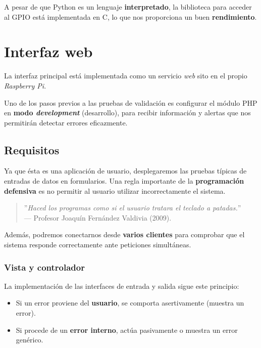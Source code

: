 A pesar de que Python es un lenguaje \textbf{interpretado}, la biblioteca para acceder al \acrshort{GPIO} está implementada en C, lo que nos proporciona un buen \textbf{rendimiento}.

\newpage

\section{Interfaz web}

La interfaz principal está implementada como un servicio \textit{web} sito en el propio \textit{Raspberry Pi}. 

Uno de los pasos previos a las pruebas de validación es configurar el módulo \acrshort{PHP} en \textbf{modo \textit{development}} (desarrollo), para recibir información y alertas que nos permitirán detectar errores eficazmente.

\subsection{Requisitos}

Ya que ésta es una aplicación de usuario, desplegaremos las pruebas típicas de entradas de datos en formularios. Una regla importante de la \textbf{programación defensiva} es no permitir al usuario utilizar incorrectamente el sistema.

\begin{quote}
	\small \flushright ''\textit{Haced los programas como si el usuario tratara el teclado a patadas.}'' \\
	--- Profesor Joaquín Fernández Valdivia (2009).
\end{quote}

Además, podremos conectarnos desde \textbf{varios clientes} para comprobar que el sistema responde correctamente ante peticiones simultáneas.

\subsubsection{Vista y controlador}

La implementación de las interfaces de entrada y salida sigue este principio:

\begin{itemize}
	\item Si un error proviene del \textbf{usuario}, se comporta asertivamente (muestra un error).
	\item Si procede de un \textbf{error interno}, actúa pasivamente o muestra un error genérico.
\end{itemize}

